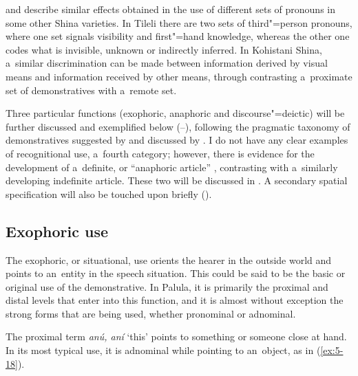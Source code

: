 \citet[204--205, 207--212]{schmidt2000} and \citet[134--136]{schmidtkohistani2001} describe similar effects obtained in the use of different sets of pronouns in some other Shina varieties. In Tileli there are two sets of third"=person pronouns, where one set signals visibility and first"=hand knowledge, whereas the other one codes what is invisible, unknown or indirectly inferred. In Kohistani Shina, a~similar discrimination can be made between information derived by visual means and information received by other means, through contrasting a~proximate set of demonstratives with a~remote set. 



Three particular functions (exophoric, anaphoric and discourse"=deictic) will be further discussed and exemplified below (--), following the pragmatic taxonomy of demonstratives suggested by \citet[205--254]{himmelmann1996} and discussed by \citet[432]{diessel2006}. I do not have any clear examples of recognitional use, a~fourth category; however, there is evidence for the development of a~definite, or ``anaphoric article'' \citep[486]{juvonen2006}, contrasting with a~similarly developing indefinite article. These two will be discussed in . A secondary spatial specification will also be touched upon briefly ().


\subsection{Exophoric use}
\label{subsec:5-2-3}

The exophoric, or situational, use orients the hearer in the outside world and points to an~entity in the speech situation. This could be said to be the basic or original use of the demonstrative. In Palula, it is primarily the proximal and distal levels that enter into this function, and it is almost without exception the strong forms that are being used, whether pronominal or adnominal.


The proximal term \textit{anú, aní} `this' points to something or someone close at hand. In its most typical use, it is adnominal while pointing to an~object, as in (\ref{ex:5-18}).

